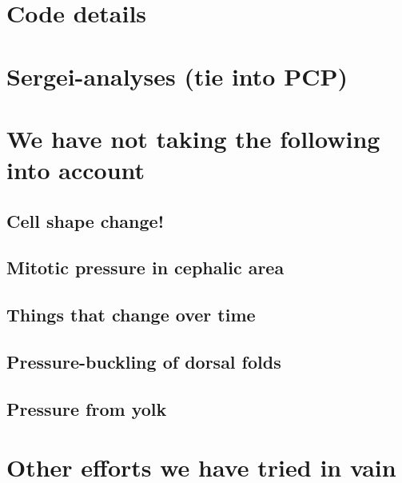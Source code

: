 \chapter*{Code details}
\label{App:Code}
\chapter*{Sergei-analyses (tie into PCP)}
\label{App:Sergei}
\chapter*{We have not taking the following into account}
\section*{Cell shape change!}
\section*{Mitotic pressure in cephalic area}
\section*{Things that change over time}
\section*{Pressure-buckling of dorsal folds}
\section*{Pressure from yolk}
\chapter*{Other efforts we have tried in vain}

